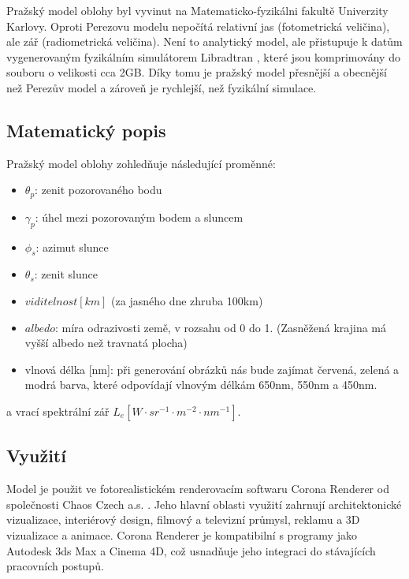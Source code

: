 Pražský model oblohy \citep{Prague2021} byl vyvinut na Matematicko-fyzikálni fakultě Univerzity Karlovy. 
Oproti Perezovu modelu nepočítá relativní jas (fotometrická veličina), ale zář (radiometrická veličina). 
Není to analytický model, ale přistupuje k datům vygenerovaným fyzikálním simulátorem Libradtran \citep{Libradtran2016}, které jsou komprimovány do souboru o velikosti cca 2GB. 
Díky tomu je pražský model přesnější a obecnější než Perezův model a zároveň je rychlejší, než fyzikální simulace.

\subsection{Matematický popis}
Pražský model oblohy zohledňuje následující proměnné: 
\begin{itemize}
  \item $\theta_p$: zenit pozorovaného bodu
  \item $\gamma_p$: úhel mezi pozorovaným bodem a sluncem
  \item $\phi_s$: azimut slunce
  \item $\theta_s$: zenit slunce
  \item $viditelnost[km]$ (za jasného dne zhruba 100km)
  \item $albedo$: míra odrazivosti země, v rozsahu od 0 do 1. (Zasněžená krajina má vyšší albedo než travnatá plocha)
  \item vlnová délka [nm]: při generování obrázků nás bude zajímat červená, zelená a modrá barva, které odpovídají vlnovým délkám 650nm, 550nm a 450nm. 
\end{itemize}
a vrací spektrální zář  $L_e [W \cdot sr^{-1} \cdot m^{-2} \cdot nm^{-1}]$.
\subsection{Využití}
Model je použit ve fotorealistickém renderovacím softwaru Corona Renderer od společnosti Chaos Czech a.s. \citep{corona}. 
Jeho hlavní oblasti využití zahrnují architektonické vizualizace, interiérový design, filmový a televizní průmysl, reklamu a 3D vizualizace a animace. Corona Renderer je kompatibilní s programy jako Autodesk 3ds Max a Cinema 4D, což usnadňuje jeho integraci do stávajících pracovních postupů.

